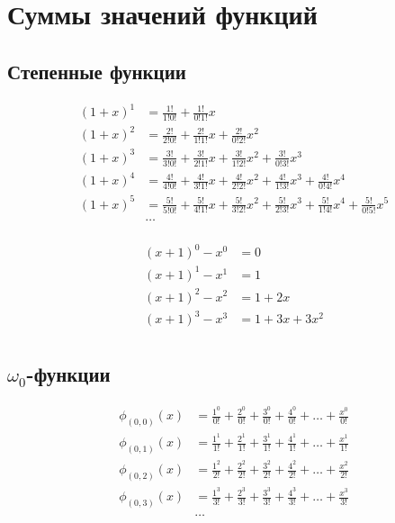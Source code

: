 
\section{Суммы значений функций}

\subsection{Степенные функции}

\begin{equation*}\begin{aligned}
(1 + x)^1 &=
  \frac{1!}{1!0!} 
+ \frac{1!}{0!1!} x
\\
(1 + x)^2 &= 
  \frac{2!}{2!0!} 
+ \frac{2!}{1!1!} x 
+ \frac{2!}{0!2!} x^2
\\
(1 + x)^3 &=
  \frac{3!}{3!0!} 
+ \frac{3!}{2!1!} x 
+ \frac{3!}{1!2!} x^2 
+ \frac{3!}{0!3!} x^3
\\
(1 + x)^4 &=
  \frac{4!}{4!0!} 
+ \frac{4!}{3!1!} x 
+ \frac{4!}{2!2!} x^2 
+ \frac{4!}{1!3!} x^3 
+ \frac{4!}{0!4!} x^4
\\
(1 + x)^5 &=
  \frac{5!}{5!0!} 
+ \frac{5!}{4!1!} x 
+ \frac{5!}{3!2!} x^2 
+ \frac{5!}{2!3!} x^3 
+ \frac{5!}{1!4!} x^4
+ \frac{5!}{0!5!} x^5
\\
&\ldots
\\
\end{aligned}\end{equation*}

\begin{equation*}\begin{aligned}
(x + 1)^0 - x^0 &= 0 \\
(x + 1)^1 - x^1 &= 1 \\
(x + 1)^2 - x^2 &= 1 + 2x \\
(x + 1)^3 - x^3 &= 1 + 3x + 3x^2 \\
\end{aligned}\end{equation*}

\subsection{$\omega_0$-функции}

\begin{equation*} \begin{aligned}
\phi_{(0,0)}(x) &=
  \frac{1^0}{0!} 
+ \frac{2^0}{0!} 
+ \frac{3^0}{0!} 
+ \frac{4^0}{0!} 
+ \ldots 
+ \frac{x^0}{0!} \\
%
\phi_{(0,1)}(x) &= 
  \frac{1^1}{1!} 
+ \frac{2^1}{1!} 
+ \frac{3^1}{1!} 
+ \frac{4^1}{1!} 
+ \ldots 
+ \frac{x^1}{1!} \\
%
\phi_{(0,2)}(x) &= 
  \frac{1^2}{2!} 
+ \frac{2^2}{2!} 
+ \frac{3^2}{2!} 
+ \frac{4^2}{2!} 
+ \ldots 
+ \frac{x^2}{2!} \\
%
\phi_{(0,3)}(x) &= 
  \frac{1^3}{3!} 
+ \frac{2^3}{3!} 
+ \frac{3^3}{3!} 
+ \frac{4^3}{3!} 
+ \ldots 
+ \frac{x^3}{3!} \\
%
&\ldots \\
\end{aligned} \end{equation*}

